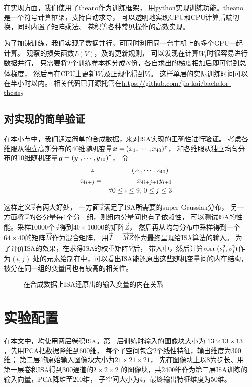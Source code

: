 在实现方面，我们使用了theano\cite{bergstra+al:2010-scipy}作为训练框架，
用python实现训练功能。theano是一个符号计算框架，支持自动求导，
可以透明地实现GPU和CPU计算后端切换，同时内置了矩阵乘法、
卷积等各种常见操作的高效实现。

为了加速训练，我们实现了数据并行，可同时利用同一台主机上的多个GPU一起计算。
观察的损失函数$L(V)$，及的更新规则，
可以发现在计算$\vec{W_i}$时很容易进行数据并行，
只需要将$T$个训练样本拆分成$N$份，各自求出的梯度相加后即可得到总体梯度，
然后再在CPU上更新$\vec{W_i}$及正规化得到$\vec{V_i}$。
这样单层的实际训练时间可以在半小时以内。
相关代码已开源托管在\url{https://github.com/jia-kai/bachelor-thesis}。


\subsection{对实现的简单验证}
在本小节中，我们通过简单的合成数据，来对ISA实现的正确性进行验证。
考虑各维服从独立高斯分布的40维随机变量$\boldsymbol{x}=(x_1,\cdots,x_{40})^\intercal$，
和各维服从独立均匀分布的10维随机变量$\boldsymbol{y}=(y_1, \cdots, y_{10})^\intercal$，
令
\begin{eqnarray}
    \boldsymbol{z} &=& (z_1, \cdots, z_{40})^\intercal \nonumber \\
    z_{4i+j} &=& x_{4i+j+1}y_{i+1} \nonumber \\
    && \forall 0 \le i \le 9,\,0 \le j \le 3
\end{eqnarray}

这样定义$\vec{z}$有两大好处，
一方面$\vec{z}$满足了ISA所需要的super-Gaussian分布，
另一方面将$\vec{z}$的各分量每4个分一组，则组内分量间也有了依赖性，
可以测试ISA的性能。采样$10000$个$\vec{z}$得到$40\times 10000$的矩阵$\vec{Z}$，
然后再从均匀分布中采样得到一个$64\times 40$的矩阵$\vec{M}$作为混合矩阵，
用$\vec{I} = \vec{M}\vec{Z}$作为最终呈现给ISA算法的输入。
为了评价ISA的效果，在求得ISA的权重矩阵$\vec{V}$后，
带入中，然后计算$\text{corr}\left(s_i^2, s_j^2\right)$作为$(i, j)$
处的元素绘制在中，可以看出ISA能还原出这些随机变量间的内在结构，
被分在同一组的变量间也有较高的相关性。

\begin{figure}[H]
    \caption{在合成数据上ISA还原出的输入变量的内在关系}
    \label{fig:isa:test}
\end{figure}


\section{实验配置\label{sec:isa:expr}}
在本文中，均使用两层卷积ISA。第一层训练时输入的图像块大小为
$13\times 13 \times 13$，先用PCA把数据降维到$600$维，
每个子空间包含$2$个线性特征，输出维度为$300$维；
第二层的原始输入图像块大小为$21 \times 21 \times 21$，
先在图像块上以$8$为步长、用第一层卷积ISA得到$300$通道的$2\times 2 \times 2$
的图像块，共$2400$维作为第二层ISA训练的输入向量，PCA降维至$200$维，
子空间大小为$4$，最终输出特征维度为$50$维。

